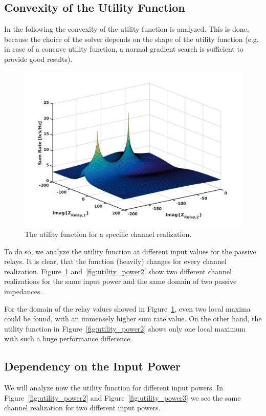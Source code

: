 \subsection{Convexity of the Utility Function}
\label{sec:}

In the following the convexity of the utility function is analyzed.
This is done, because the choice of the solver depends on the shape of the utility function (e.g. in case of a concave utility function, a normal gradient search is sufficient to provide good results).
\begin{figure}[h]
\centering
  \includegraphics[width=0.8\linewidth]{images/full_mesh_highsnr_93.png}
\caption{The utility function for a specific channel realization.}
\label{fig:utility_power1}
\end{figure}

To do so, we analyze the utility function at different input values for the passive relays.
It is clear, that the function (heavily) changes for every channel realization.
Figure~\ref{fig:utility_power1} and~\ref{fig:utility_power2} show two different channel realizations for the same input power and the same domain of two passive impedances.


For the domain of the relay values showed in Figure~\ref{fig:utility_power1}, even two local maxima could be found, with an immensely higher sum rate value.
On the other hand, the utility function in Figure~\ref{fig:utility_power2} shows only one local maximum with such a huge performance difference. 


\subsection{Dependency on the Input Power}
\label{sec:}

We will analyze now the utility function for different input powers.
In Figure~\ref{fig:utility_power2} and Figure~\ref{fig:utility_power3} we see the same channel realization for two different input powers.

